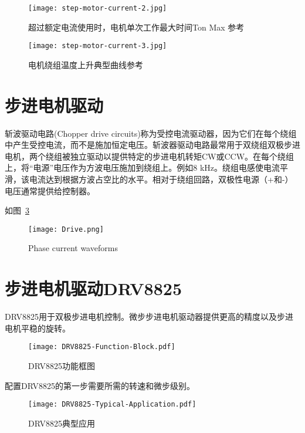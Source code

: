 \begin{figure}[htbp]
    \centering
    \texttt{[image: step-motor-current-2.jpg]}
    \caption{超过额定电流使用时，电机单次工作最大时间Ton Max 参考}
    \label{fig:step-motor-current-2}
\end{figure}

\begin{figure}[htbp]
    \centering
    \texttt{[image: step-motor-current-3.jpg]}
    \caption{电机绕组温度上升典型曲线参考}
    \label{fig:step-motor-current-3}
\end{figure}

\section{步进电机驱动}

斩波驱动电路(Chopper drive circuits)称为受控电流驱动器，因为它们在每个绕组中产生受控电流，而不是施加恒定电压。斩波器驱动电路最常用于双绕组双极步进电机，两个绕组被独立驱动以提供特定的步进电机转矩CW或CCW。在每个绕组上，将“电源”电压作为方波电压施加到绕组上。例如8 kHz。绕组电感使电流平滑，该电流达到根据方波占空比的水平。相对于绕组回路，双极性电源（+和-）电压通常提供给控制器。

如图~\ref{fig:Phase-current}

\begin{figure}[htbp]
    \centering
    \texttt{[image: Drive.png]}
    \caption{Phase current waveforms}
    \label{fig:Phase-current}
\end{figure}

\section{步进电机驱动DRV8825}

DRV8825用于双极步进电机控制。微步步进电机驱动器提供更高的精度以及步进电机平稳的旋转。

\begin{figure}[htbp]
    \centering
    \texttt{[image: DRV8825-Function-Block.pdf]}
    \caption{DRV8825功能框图}
    \label{fig:DRV8825-Function-Block}
\end{figure}

配置DRV8825的第一步需要所需的转速和微步级别。

\begin{figure}[htbp]
    \centering
    \texttt{[image: DRV8825-Typical-Application.pdf]}
    \caption{DRV8825典型应用}
    \label{fig:DRV8825-Typical-Application}
\end{figure}


